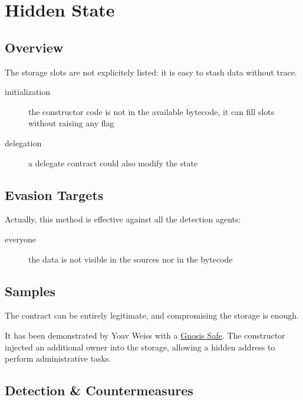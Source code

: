 \section{Hidden State} \label{sec:hidden-state}

\subsection{Overview}

The storage slots are not explicitely listed: it is easy to stash data without trace.

\begin{description}
\item[initialization]{the constructor code is not in the available bytecode, it can fill slots without raising any flag}
\item[delegation]{a delegate contract could also modify the state}
\end{description}

\subsection{Evasion Targets}

Actually, this method is effective against all the detection agents:

\begin{description}
\item[everyone]{the data is not visible in the sources nor in the bytecode}
\end{description}

\subsection{Samples}

The contract can be entirely legitimate, and compromising the storage is enough.

It has been demonstrated by Yoav Weiss \cite{video-masquerading-code} with a \href{https://github.com/safe-global/safe-contracts}{Gnosis Safe}.
The constructor injected an additional owner into the storage, allowing a hidden address to perform administrative tasks.

\subsection{Detection \& Countermeasures}

\begin{description}
\item[]{}
\end{description}
